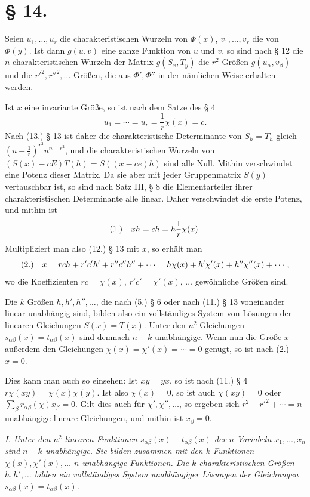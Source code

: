 \documentclass[11pt]{article}
\newcommand{\fnum}[1]{\textup{(\ensuremath{#1}.)}\quad}
\begin{document}
\section*{§ 14.}

Seien $u_1,\ldots,u_r$ die charakteristischen Wurzeln von $\Phi(x)$, $v_1,\ldots,v_r$ die von $\Phi(y)$. Ist dann $g(u,v)$ eine ganze Funktion von $u$ und $v$, so sind nach § 12 die $n$ charakteristischen Wurzeln der Matrix $g(S_x,T_y)$ die $r^2$ Größen $g(u_\alpha,v_\beta)$ und die $r'^2,r''^2,\ldots$ Größen, die aus $\Phi',\Phi''$ in der nämlichen Weise erhalten werden.

Ist $x$ eine invariante Größe, so ist nach dem Satze des § 4
\[
 u_1=\cdots=u_r=\frac1r\chi(x)=c.
\]
Nach (13.) § 13 ist daher die charakteristische Determinante von $S_h=T_h$ gleich $(u-\frac1r)^{r^2}u^{n-r^2}$, und die charakteristischen Wurzeln von $(S(x)-cE)T(h)=S((x-ce)h)$ sind alle Null. Mithin verschwindet eine Potenz dieser Matrix. Da sie aber mit jeder Gruppenmatrix $S(y)$ vertauschbar ist, so sind nach Satz III, § 8 die Elementarteiler ihrer charakteristischen Determinante alle linear. Daher verschwindet die erste Potenz, und mithin ist
\[
\fnum{1} xh=ch=h\frac1r\chi(x).
\]
Multipliziert man also (12.) § 13 mit $x$, so erhält man
\[
\fnum{2} x=rch+r'c'h'+r''c''h''+\cdots
=h\chi(x)+h'\chi'(x)+h''\chi''(x)+\cdots,
\]
wo die Koeffizienten $rc=\chi(x)$, $r'c'=\chi'(x)$, $\ldots$ gewöhnliche Größen sind.

Die $k$ Größen $h,h',h'',\ldots$, die nach (5.) § 6 oder nach (11.) § 13 voneinander linear unabhängig sind, bilden also ein vollständiges System von Lösungen der linearen Gleichungen $S(x)=T(x)$. Unter den $n^2$ Gleichungen $s_{\alpha\beta}(x)=t_{\alpha\beta}(x)$ sind demnach $n-k$ unabhängige. Wenn nun die Größe $x$ außerdem den Gleichungen $\chi(x)=\chi'(x)=\cdots=0$ genügt, so ist nach (2.) $x=0$.

Dies kann man auch so einsehen: Ist $xy=yx$, so ist nach (11.) § 4 $r\chi(xy)=\chi(x)\chi(y)$. Ist also $\chi(x)=0$, so ist auch $\chi(xy)=0$ oder $\sum_\beta r_{\alpha\beta}(\chi)x_\beta=0$. Gilt dies auch für $\chi',\chi'',\ldots$, so ergeben sich $r^2+r'^2+\cdots=n$ unabhängige lineare Gleichungen, und mithin ist $x_\beta=0$.

\emph{I. Unter den $n^2$ linearen Funktionen $s_{\alpha\beta}(x)-t_{\alpha\beta}(x)$ der $n$ Variabeln $x_1,\ldots,x_n$ sind $n-k$ unabhängige. Sie bilden zusammen mit den $k$ Funktionen $\chi(x),\chi'(x),\ldots$ $n$ unabhängige Funktionen. Die $k$ charakteristischen Größen $h,h',\ldots$ bilden ein vollständiges System unabhängiger Lösungen der Gleichungen $s_{\alpha\beta}(x)=t_{\alpha\beta}(x)$.}
\end{document}

